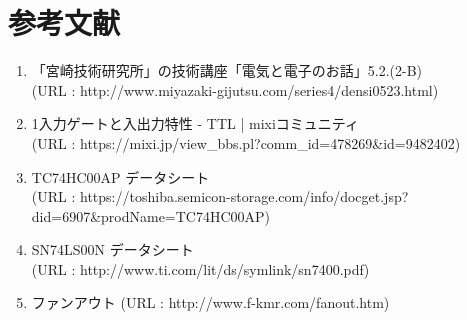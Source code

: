 \documentclass[10pt, a4j, dvipdfmx]{jarticle}
\begin{document}
\section{参考文献}
\begin{enumerate}
	\item 「宮崎技術研究所」の技術講座「電気と電子のお話」5.2.(2-B)\\ (URL : http://www.miyazaki-gijutsu.com/series4/densi0523.html)

	\item 1入力ゲートと入出力特性 - TTL | mixiコミュニティ\\ (URL : https://mixi.jp/view\_bbs.pl?comm\_id=478269\&id=9482402)

	\item TC74HC00AP データシート\\ (URL : https://toshiba.semicon-storage.com/info/docget.jsp?did=6907\&prodName=TC74HC00AP)

	\item SN74LS00N データシート\\ (URL : http://www.ti.com/lit/ds/symlink/sn7400.pdf)

	\item ファンアウト (URL : http://www.f-kmr.com/fanout.htm)
	
\end{enumerate}
\end{document}
